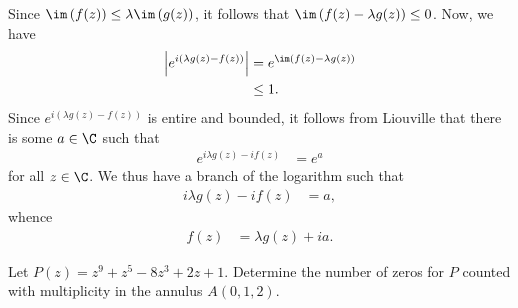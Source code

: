 \documentclass[10pt]{mypackage}
\begin{document}
\begin{solution}
  Since $\im\left( f(z) \right) \leq \lambda \im\left( g(z) \right)$, it follows that $\im\left( f(z) - \lambda g(z) \right) \leq 0$. Now, we have
  \begin{align*}
    \left\vert e^{i\left( \lambda g(z) - f(z) \right)} \right\vert &= e^{\im\left( f(z) - \lambda g(z) \right)}\\
                                                                   &\leq 1.
  \end{align*}
  Since $e^{i\left( \lambda g(z) - f(z) \right)}$ is entire and bounded, it follows from Liouville that there is some $a\in \C$ such that
  \begin{align*}
    e^{i\lambda g(z) - if(z)} &= e^{a}
  \end{align*}
  for all $z\in \C$. We thus have a branch of the logarithm such that
  \begin{align*}
    i\lambda g(z) - if(z) &= a,
  \end{align*}
  whence
  \begin{align*}
    f(z) &= \lambda g(z) + ia.
  \end{align*}
\end{solution}
\begin{problem}[Problem 4]
  Let $P(z) = z^{9} + z^{5} - 8z^3 + 2z + 1$. Determine the number of zeros for $P$ counted with multiplicity in the annulus $A\left( 0,1,2 \right)$.
\end{problem}
\end{document}
